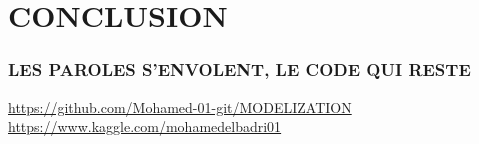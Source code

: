 \section{CONCLUSION}

\begin{frame}
\frametitle{LES PAROLES S'ENVOLENT, LE CODE QUI RESTE}
\url{https://github.com/Mohamed-01-git/MODELIZATION}
\url{https://www.kaggle.com/mohamedelbadri01}
\end{frame}